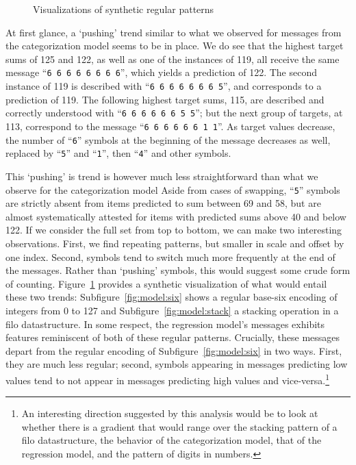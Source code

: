 \documentclass[twocolumn]{article}
\begin{document}
\begin{figure}
{
    }
    \caption{Visualizations of synthetic regular patterns}
    \label{fig:model}
\end{figure}


At first glance, a `pushing' trend similar to what we observed for messages from the categorization model seems to be in place.
We do see that the highest target sums of 125 and 122, as well as one of the instances of 119, all receive the same message ``\textcolor{Blues-K}{\tt 6~6~6~6~6~6~6~6}'', which yields a prediction of 122.
The second instance of 119 is described with ``{\tt \textcolor{Blues-K}{6~6~6~6~6~6~6}~\textcolor{Blues-I}{5}}'', and corresponds to a prediction of 119.
The following highest target sums, 115, are described and correctly understood with ``{\tt \textcolor{Blues-K}{6~6~6~6~6~6}~\textcolor{Blues-I}{5~5}}''; 
but the next group of targets, at 113, correspond to the message ``{\tt \textcolor{Blues-K}{6~6~6~6~6~6}~\textcolor{Blues-G}{1~1}}''.
As target values decrease, the number of ``\textcolor{Blues-K}{\tt 6}'' symbols at the beginning of the message decreases as well, replaced by ``\textcolor{Blues-I}{\tt 5}'' and ``\textcolor{Blues-G}{\tt 1}'', then ``\textcolor{Blues-F}{\tt 4}'' and other symbols.

This `pushing' is trend is however much less straightforward than what we observe for the categorization model
Aside from cases of swapping, ``\textcolor{Blues-I}{\tt 5}'' symbols are strictly absent from items predicted to sum between 69 and 58, but are almost systematically attested for items with predicted sums above 40 and below 122.
If we consider the full set from top to bottom, we can make two interesting observations.
First, we find repeating patterns, but smaller in scale and offset by one index.
Second, symbols tend to switch much more frequently at the end of the messages. 
Rather than `pushing' symbols, this would suggest some crude form of counting.
Figure~\ref{fig:model} provides a synthetic visualization of what would entail these two trends:
Subfigure~\ref{fig:model:six} shows a regular base-six encoding of integers from 0 to 127 and Subfigure~\ref{fig:model:stack} a stacking operation in a {\sc filo} datastructure.
In some respect, the regression model's messages exhibits features reminiscent of both of these regular patterns.
Crucially, these messages depart from the regular encoding of Subfigure~\ref{fig:model:six} in two ways.
First, they are much less regular; second, symbols appearing in messages predicting low values tend to not appear in messages predicting high values and vice-versa.\footnote{
    An interesting direction suggested by this analysis would be to look at whether there is a gradient that would range over the stacking pattern of a {\sc filo} datastructure, the behavior of the categorization model, that of the regression model, and the pattern of digits in numbers. 
}
\end{document}

